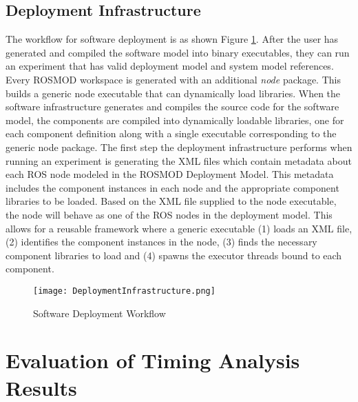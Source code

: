 \subsection{Deployment Infrastructure}
\label{sec:Deployment_Infrastructure}

The workflow for software deployment is as shown Figure \ref{fig:workflow}. After the user has generated and compiled the software model into binary executables, they can run an experiment that has valid deployment model and system model references. Every ROSMOD workspace is generated with an additional \emph{node} package. This builds a generic node executable that can dynamically load libraries. When the software infrastructure generates and compiles the source code for the software model, the components are compiled into dynamically loadable libraries, one for each component definition along with a single executable corresponding to the generic node package. The first step the deployment infrastructure performs when running an experiment is generating the XML files which contain metadata about each ROS node modeled in the ROSMOD Deployment Model. This metadata includes the component instances in each node and the appropriate component libraries to be loaded. Based on the XML file supplied to the node executable, the node will behave as one of the ROS nodes in the deployment model. This allows for a reusable framework where a generic executable (1) loads an XML file, (2) identifies the component instances in the node, (3) finds the necessary component libraries to load and (4) spawns the executor threads bound to each component.

\begin{figure}[ht]
	\centering
	\texttt{[image: DeploymentInfrastructure.png]}
	\caption{Software Deployment Workflow}
	\label{fig:workflow}
\end{figure}
\FloatBarrier

\section{Evaluation of Timing Analysis Results}

